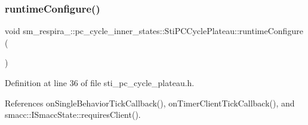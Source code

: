 \subsubsection{\texorpdfstring{runtime\+Configure()}{runtimeConfigure()}}
{\footnotesize\ttfamily void sm\+\_\+respira\+\_\+::pc\+\_\+cycle\+\_\+inner\+\_\+states\+::\+Sti\+P\+C\+Cycle\+Plateau\+::runtime\+Configure (\begin{DoxyParamCaption}{ }\end{DoxyParamCaption})\hspace{0.3cm}{\ttfamily [inline]}}



Definition at line 36 of file sti\+\_\+pc\+\_\+cycle\+\_\+plateau.\+h.



References on\+Single\+Behavior\+Tick\+Callback(), on\+Timer\+Client\+Tick\+Callback(), and smacc\+::\+I\+Smacc\+State\+::requires\+Client().


